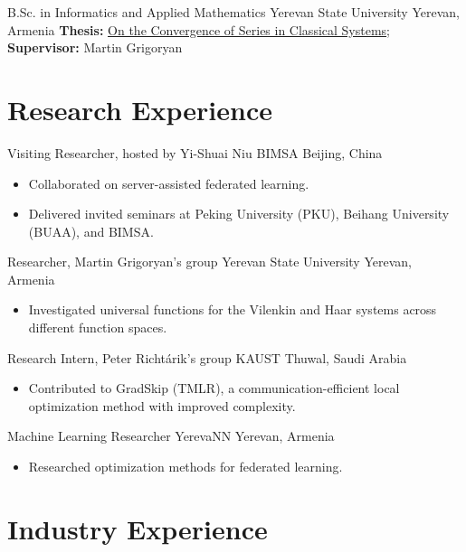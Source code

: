 \documentclass[10pt,a4paper,sans]{moderncv}        %
\newcommand{\peter}{Peter Richt\'{a}rik}
\newcommand{\grigoryan}{Martin Grigoryan}
\newcommand{\kaust}{KAUST}
\newcommand{\yerevann}{YerevaNN}
\newcommand{\yerevan}{Yerevan, Armenia}
\newcommand{\thuwal}{Thuwal, Saudi Arabia}
\newcommand{\ysu}{Yerevan State University}
\begin{document}
{B.Sc. in Informatics and Applied Mathematics}
{\ysu}
{\yerevan}{}
{\textbf{Thesis:} \href{https://artomaranjyan.github.io/assets/pdf/Bachelor_thesis.pdf}{On the Convergence of Series in Classical Systems}; \textbf{Supervisor:} \grigoryan}

\section{Research Experience}

{Visiting Researcher, hosted by Yi-Shuai Niu}
{BIMSA}
{Beijing, China}
{}
{
  \begin{itemize}
    \item Collaborated on server-assisted federated learning.
    \item Delivered invited seminars at Peking University (PKU), Beihang University (BUAA), and BIMSA.
  \end{itemize}
}

{Researcher, \grigoryan's group}
{\ysu}
{\yerevan}
{}
{
  \begin{itemize}
    \item Investigated universal functions for the Vilenkin and Haar systems across different function spaces.
  \end{itemize}
}

{Research Intern, \peter's group}
{\kaust}
{\thuwal}
{}
{
  \begin{itemize}
    \item Contributed to GradSkip (TMLR), a communication-efficient local optimization method with improved complexity.
  \end{itemize}
}

{Machine Learning Researcher}
{\yerevann}
{\yerevan}
{}
{
  \begin{itemize}
    \item Researched optimization methods for federated learning.
  \end{itemize}
}

\section{Industry Experience}
\end{document}
